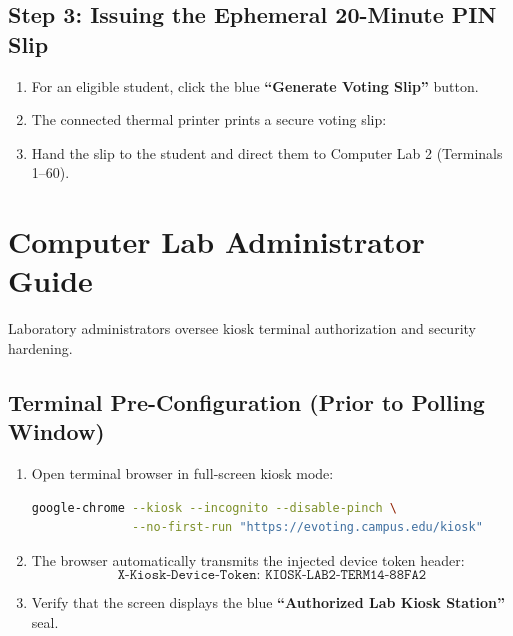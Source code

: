 \documentclass[12pt,a4paper,oneside]{report}
\begin{document}
\subsection{Step 3: Issuing the Ephemeral 20-Minute PIN Slip}
\begin{enumerate}
    \item For an eligible student, click the blue \textbf{``Generate Voting Slip''} button.
    \item The connected thermal printer prints a secure voting slip:
    \begin{center}
    \end{center}
    \item Hand the slip to the student and direct them to Computer Lab 2 (Terminals 1--60).
\end{enumerate}

\section{Computer Lab Administrator Guide}
Laboratory administrators oversee kiosk terminal authorization and security hardening.

\subsection{Terminal Pre-Configuration (Prior to Polling Window)}
\begin{enumerate}
    \item Open terminal browser in full-screen kiosk mode:
    \begin{lstlisting}[language=bash]
google-chrome --kiosk --incognito --disable-pinch \
              --no-first-run "https://evoting.campus.edu/kiosk"
    \end{lstlisting}
    \item The browser automatically transmits the injected device token header:
    \begin{equation*}
        \texttt{X-Kiosk-Device-Token: KIOSK-LAB2-TERM14-88FA2}
    \end{equation*}
    \item Verify that the screen displays the blue \textbf{``Authorized Lab Kiosk Station''} seal.
\end{enumerate}
\end{document}
